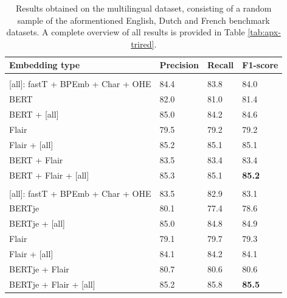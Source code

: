 \documentclass[12pt,a4paper,]{book}
\begin{document}
\begin{table}

\caption{\label{tab:benchmark-multi-tab}Results obtained on the multilingual dataset, consisting of a random sample of the aformentioned English, Dutch and French benchmark datasets. A complete overview of all results is provided in Table \ref{tab:apx-trired}.}
\centering
\begin{tabular}[t]{llll}
\toprule
Embedding type & Precision & Recall & F1-score\\
\midrule
\addlinespace[0.3em]
\multicolumn{4}{l}{\textbf{Monolingual English embeddings}}\\
\hspace{1em}[all]: fastT + BPEmb + Char + OHE & 84.4 & 83.8 & 84.0\\
\hspace{1em}BERT & 82.0 & 81.0 & 81.4\\
\hspace{1em}BERT + [all] & 85.0 & 84.2 & 84.6\\
\hspace{1em}Flair & 79.5 & 79.2 & 79.2\\
\hspace{1em}Flair + [all] & 85.2 & 85.1 & 85.1\\
\hspace{1em}BERT + Flair & 83.5 & 83.4 & 83.4\\
\hspace{1em}BERT + Flair + [all] & 85.3 & 85.1 & \textbf{85.2}\\
\addlinespace[0.3em]
\multicolumn{4}{l}{\textbf{Monolingual Dutch embeddings}}\\
\hspace{1em}[all]: fastT + BPEmb + Char + OHE & 83.5 & 82.9 & 83.1\\
\hspace{1em}BERTje & 80.1 & 77.4 & 78.6\\
\hspace{1em}BERTje + [all] & 85.0 & 84.8 & 84.9\\
\hspace{1em}Flair & 79.1 & 79.7 & 79.3\\
\hspace{1em}Flair + [all] & 84.1 & 84.2 & 84.1\\
\hspace{1em}BERTje + Flair & 80.7 & 80.6 & 80.6\\
\hspace{1em}BERTje + Flair + [all] & 85.2 & 85.8 & \textbf{85.5}\\

\end{tabular}
\end{table}
\end{document}
